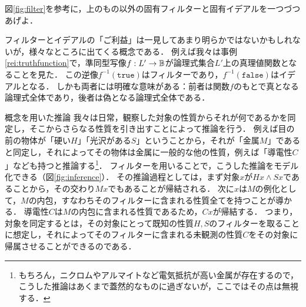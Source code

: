 \documentclass[11pt,a4paper, dvipdfmx]{jsarticle}
\begin{document}
\begin{renshu}{}{}
図\ref{fig:filter}を参考に，上のもの以外の固有フィルターと固有イデアルを一つづつあげよ．
\end{renshu}

フィルターとイデアルの「ご利益」は一見してあまり明らかではないかもしれないが，様々なところに出てくる概念である．
例えば我々は事例\ref{rei:truthfunction}で，準同型写像$f:L' \to \mathbb{B}$が論理式集合$L'$上の真理値関数となることを見た．
この逆像$f^{-1}(\texttt{true})$はフィルターであり，$f^{-1}(\texttt{false})$はイデアルとなる．
しかも両者には明確な意味がある：前者は関数$f$のもとで真となる論理式全体であり，後者は偽となる論理式全体である．


\begin{rei}{概念を用いた推論}{}
我々は日常，観察した対象の性質からそれが何であるかを同定し，そこからさらなる性質を引き出すことによって推論を行う．
例えば目の前の物体が「硬い$H$」「光沢がある$S$」ということから，それが「金属$M$」であると同定し，それによってその物体は金属に一般的な他の性質，例えば「導電性$C$」なども持つと推論する\footnote{もちろん，ニクロムやアルマイトなど電気抵抗が高い金属が存在するので，こうした推論はあくまで蓋然的なものに過ぎないが，ここではその点は無視する．}．
フィルターを用いることで，こうした推論をモデル化できる（図\ref{fig:inference}）．
その推論過程としては，まず対象$x$が$Hx \wedge Sx$であることから，その交わり$Mx$でもあることが帰結される．
次に$x$は$M$の例化として，$M$の内包，すなわちそのフィルターに含まれる性質全てを持つことが導かる．
導電性$C$は$M$の内包に含まれる性質であるため，$Cx$が帰結する．
つまり，対象を同定するとは，その対象にとって既知の性質$H, S$のフィルターを取ることに想定し，それによってそのフィルターに含まれる未観測の性質$C$をその対象に帰属させることができるのである．
\end{rei}
\end{document}
